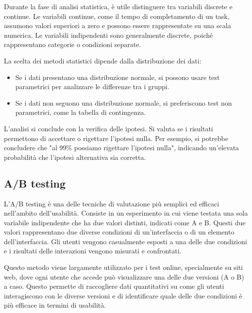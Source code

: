 Durante la fase di analisi statistica, è utile distinguere tra variabili discrete e continue. Le variabili continue, come il tempo di completamento di un task, assumono valori superiori a zero e possono essere rappresentate su una scala numerica. Le variabili indipendenti sono generalmente discrete, poiché rappresentano categorie o condizioni separate.

La scelta dei metodi statistici dipende dalla distribuzione dei dati:
\begin{itemize}
    \item Se i dati presentano una distribuzione normale, si possono usare test parametrici per analizzare le differenze tra i gruppi.
    \item Se i dati non seguono una distribuzione normale, si preferiscono test non parametrici, come la tabella di contingenza.
\end{itemize}
L’analisi si conclude con la verifica delle ipotesi. Si valuta se i risultati permettono di accettare o rigettare l’ipotesi nulla. Per esempio, si potrebbe concludere che "al 99\% possiamo rigettare l'ipotesi nulla", indicando un'elevata probabilità che l'ipotesi alternativa sia corretta.

\subsection{A/B testing}
L’A/B testing è una delle tecniche di valutazione più semplici ed efficaci nell’ambito dell’usabilità. Consiste in un esperimento in cui viene testata una sola variabile indipendente che ha due valori distinti, indicati come A e B. Questi due valori rappresentano due diverse condizioni di un’interfaccia o di un elemento dell’interfaccia. Gli utenti vengono casualmente esposti a una delle due condizioni e i risultati delle interazioni vengono misurati e confrontati.

Questo metodo viene largamente utilizzato per i test online, specialmente su siti web, dove ogni utente che accede può visualizzare una delle due versioni (A o B) a caso. Questo permette di raccogliere dati quantitativi su come gli utenti interagiscono con le diverse versioni e di identificare quale delle due condizioni è più efficace in termini di usabilità.

